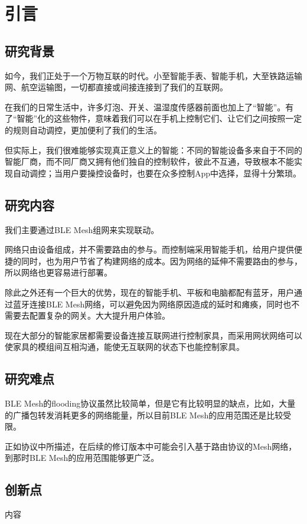 \chapter{引言}

\section{研究背景}
如今，我们正处于一个万物互联的时代。小至智能手表、智能手机，大至铁路运输网、航空运输图，一切都直接或间接连接到了我们的互联网。

在我们的日常生活中，许多灯泡、开关、温湿度传感器前面也加上了“智能”。有了“智能”化的这些物件，意味着我们可以在手机上控制它们、让它们之间按照一定的规则自动调控，更加便利了我们的生活。

但实际上，我们很难能够实现真正意义上的智能：不同的智能设备多来自于不同的智能厂商，而不同厂商又拥有他们独自的控制软件，彼此不互通，导致根本不能实现自动调控；当用户要操控设备时，也要在众多控制App中选择，显得十分繁琐。

\section{研究内容}
我们主要通过BLE Mesh组网来实现联动。

网络只由设备组成，并不需要路由的参与。而控制端采用智能手机，给用户提供便捷的同时，也为用户节省了构建网络的成本。因为网络的延伸不需要路由的参与，所以网络也更容易进行部署。

除此之外还有一个巨大的优势，现在的智能手机、平板和电脑都配有蓝牙，用户通过蓝牙连接BLE Mesh网络，可以避免因为网络原因造成的延时和瘫痪，同时也不需要去配置复杂的网关。大大提升用户体验。\cite{bleinfo}

现在大部分的智能家居都需要设备连接互联网进行控制家具，而采用网状网络可以使家具的模组间互相沟通，能使无互联网的状态下也能控制家具。

\section{研究难点}
BLE Mesh的flooding协议虽然比较简单，但是它有比较明显的缺点，比如，大量的广播包转发消耗更多的网络能量，所以目前BLE Mesh的应用范围还是比较受限。

正如协议中所描述，在后续的修订版本中可能会引入基于路由协议的Mesh网络，到那时BLE Mesh的应用范围能够更广泛。\cite{flooding}

\section{创新点}
内容